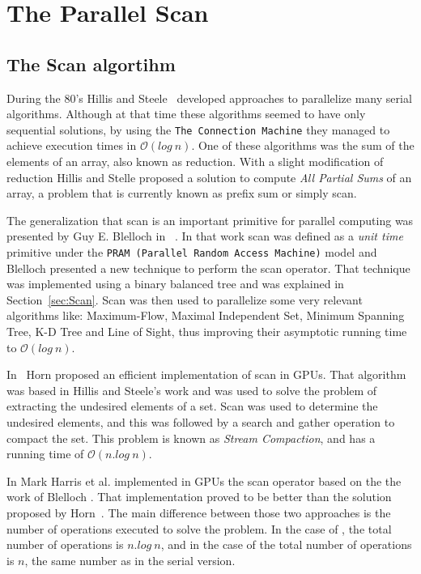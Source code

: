 \documentclass[Ingles]{ic-tese-v1}
\newcommand{\rsec}[1]{Section~\ref{sec:#1}}
\newcommand{\ttt}[1]{{\texttt{#1}}}
\begin{document}
\chapter{The Parallel Scan}
\label{cap:Scan}

\section{The Scan algortihm}
\label{sec:ScanAlg}

During  the 80's  Hillis and  Steele~\cite{dataparallel} developed 
approaches to parallelize many serial  algorithms. Although at that time
these algorithms  seemed to have only  sequential solutions, by  using the
\ttt{The  Connection Machine}  \cite{themachine} they  managed to achieve
execution times in $\mathcal{O}(log\ n)$.  One of these algorithms was
the sum of  the elements of an  array, also known as  reduction.  With a
slight modification of reduction Hillis and Stelle proposed a solution
to compute \textit{All Partial Sums} of an array,  a problem that
is currently known as prefix sum or simply scan.

The generalization that scan is an important  primitive
for  parallel  computing  was  presented   by  Guy  E.   Blelloch  in
~\cite{ScanAsPrimitive}. In  that work scan was  defined as a
\textit{unit time}  primitive under the \texttt{PRAM  (Parallel Random
	Access Machine)}  model and  Blelloch presented  a new  technique to
perform  the scan  operator. That  technique was  implemented using  a
binary balanced tree  and was explained in  \rsec{Scan}.  Scan 
was  then used   to  parallelize   some  very  relevant   algorithms  like:
Maximum-Flow, Maximal Independent Set, Minimum Spanning Tree, K-D Tree
and Line  of Sight,  thus improving their  asymptotic running  time to
$\mathcal{O}(log\ n)$.

In~\cite{GPUGems2}  Horn  proposed  an  efficient
implementation of  scan in GPUs.   That algorithm was based  in Hillis
and Steele's work and was used  to solve the problem of extracting the
undesired elements  of a set.  Scan  was used to
determine  the undesired elements, and this was followed by a search
and  gather   operation  to   compact the set.  This   problem  is   known  as
\textit{Stream   Compaction},  and has a running  time   of
$\mathcal{O}(n.log\ n)$. 

In \cite{harris2007parallel} Mark Harris  et al.  implemented in GPUs the scan
operator     based     on     the     the     work     of     Blelloch
\cite{ScanAsPrimitive}. That  implementation proved to be  better than
the solution  proposed by  Horn~\cite{GPUGems2}.  The  main difference
between those two  approaches is the number of  operations executed to
solve the problem. In the case of \cite{GPUGems2}, the total number of
operations is $n.log\ n$, and in the case of \cite{harris2007parallel}
the  total number  of operations  is $n$,  the same  number as  in the
serial version.  
\end{document}
